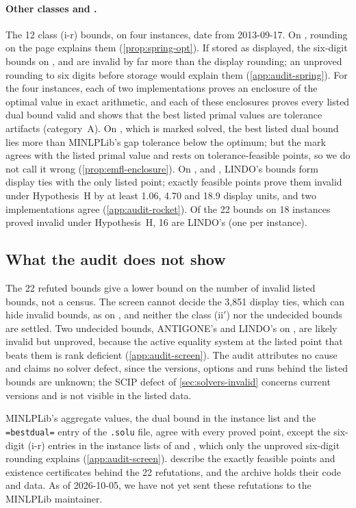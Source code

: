 \paragraph{Other classes and .}
The 12 class (i-r) bounds, on four instances, date from 2013-09-17.
On , rounding on the page explains them (\cref{prop:spring-opt}).
If stored as displayed, the six-digit bounds on ,  and  are invalid by far more than the display rounding; an unproved rounding to six digits before storage would explain them (\cref{app:audit-spring}).
For the four  instances, each of two implementations proves an enclosure of the optimal value in exact arithmetic, and each of these enclosures proves every listed dual bound valid and shows that the best listed primal values are tolerance artifacts (category~A).
On , which is marked solved, the best listed dual bound lies more than MINLPLib's gap tolerance below the optimum; but the mark agrees with the listed primal value and rests on tolerance-feasible points, so we do not call it wrong (\cref{prop:emfl-enclosure}).
On ,  and , LINDO's bounds form display ties with the only listed point; exactly feasible points prove them invalid under Hypothesis~H by at least 1.06, 4.70 and 18.9 display units, and two implementations agree (\cref{app:audit-rocket}).
Of the 22 bounds on 18 instances proved invalid under Hypothesis~H, 16 are LINDO's (one per instance).

\subsection{What the audit does not show}\label{sec:audit-limits}

The 22 refuted bounds give a lower bound on the number of invalid listed bounds, not a census.
The screen cannot decide the 3,851 display ties, which can hide invalid bounds, as on , and neither the class (ii$'$) nor the undecided bounds are settled.
Two undecided bounds, ANTIGONE's and LINDO's on , are likely invalid but unproved, because the active equality system at the listed point that beats them is rank deficient (\cref{app:audit-screen}).
The audit attributes no cause and claims no solver defect, since the versions, options and runs behind the listed bounds are unknown; the SCIP defect of \cref{sec:solvers-invalid} concerns current versions and is not visible in the listed data.

MINLPLib's aggregate values, the dual bound in the instance list and the \texttt{=bestdual=} entry of the \texttt{.solu} file, agree with every proved point, except the six-digit (i-r) entries in the instance lists of  and , which only the unproved six-digit rounding explains (\cref{app:audit-screen}).
 describe the exactly feasible points and existence certificates behind the 22 refutations, and the archive holds their code and data.
As of 2026-10-05, we have not yet sent these refutations to the MINLPLib maintainer.
